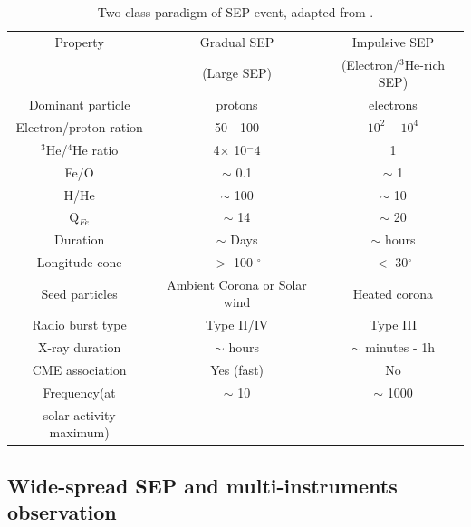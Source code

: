 \begin{table}[!h]
	\centering
	\caption[Two classes of SEP events]{Two-class paradigm of \ac{SEP} event, adapted from \citet{kallenrode2003current,	Desai_Diacalone2016LRSP, Wang2009}.}
	\begin{tabular}{|c|c|c|}
		\hline
		\hline
		Property 	& Gradual \ac{SEP} 	& Impulsive \ac{SEP} \\
					& (Large \ac{SEP})	& (Electron/$^3$He-rich \ac{SEP}) \\
		\hline
		Dominant particle	& protons	& electrons \\
		Electron/proton ration &  50 - 100 &  $10^2 - 10^4$  \\
		$^3$He/$^4$He ratio	& 4$\times$ 10$^-4$ & 1 \\
		Fe/O			& $\sim$ 0.1			& $\sim$ 1	 \\
		H/He		 	& $\sim$ 100			& $\sim$ 10 \\
		Q$_{Fe}$		& $\sim$ 14 			& $\sim$ 20 \\
		Duration		& $\sim$ Days			& $\sim$ hours \\
		Longitude cone	& $>$ 100 $^\circ$		& $<$ 30$^\circ$ \\
		Seed particles	& Ambient Corona or Solar wind & Heated corona \\
		Radio burst type		& Type II/IV	& Type III \\
		X-ray duration	& $\sim$ hours	& $\sim$ minutes - 1h \\
		CME association	& Yes (fast)	& No	\\
		Frequency(at 	& $\sim$ 10	& $\sim$ 1000 \\
		solar activity maximum)	& 	& 	\\
		\hline
	\end{tabular}
	\label{Tab:Two_type_SEP}
\end{table}


\subsection{Wide-spread SEP and multi-instruments observation}


